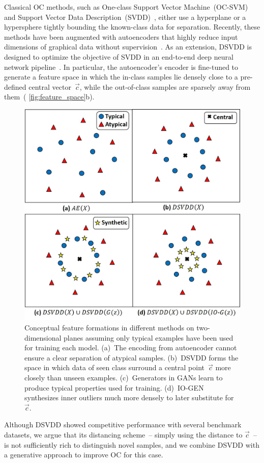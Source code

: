 \documentclass[letterpaper]{article} %
\let\orgautoref\autoref
\renewcommand{\autoref}
{\def\equationautorefname{Equation}%
\def\figureautorefname{Fig.}%
\def\subfigureautorefname{Fig.}%
\def\Itemautorefname{item}%
\def\tableautorefname{Table}%
\def\exerciseautorefname{Exercise}%
\def\starexerciseautorefname{Exercise}%
\def\sectionautorefname{Section}%
\def\subsectionautorefname{Section}%
\def\subsubsectionautorefname{Section}%
\def\chapterautorefname{Section}%
\def\partautorefname{Part}%
\orgautoref}
\begin{document}
Classical OC methods, such as One-class Support Vector
Machine~(OC-SVM)~\citep{SPSSW01} and Support Vector Data
Description~(SVDD)~\citep{TD04}, either use a hyperplane or a
hypersphere tightly bounding the known-class data for separation.
Recently, these methods have been augmented with autoencoders that
highly reduce input dimensions of graphical data without
supervision~\citep{XRYSS15, RGLL20}. As an extension, DSVDD is designed
to optimize the objective of SVDD in an end-to-end deep neural network
pipeline~\citep{RVGDSBMK18}. In particular, the autoencoder's encoder is
fine-tuned to generate a feature space in which the in-class
samples lie densely close to a pre-defined central vector~$\vec{c}$,
while the out-of-class samples are sparsely away from
them~(\autoref{fig:feature_space}b).
\begin{figure}\centering
\includegraphics[width=.7\linewidth]{feature_space}
\caption{
Conceptual feature formations in different methods on
two-dimensional planes assuming only typical examples have been
used for training each model.
(a)~The encoding from autoencoder cannot ensure a clear
separation of atypical samples.
(b)~DSVDD forms the space in which data of seen class surround a
central point~$\vec{c}$ more closely than unseen examples.
(c)~Generators in GANs learn to produce typical properties used
for training.
(d)~\mbox{IO-GEN} synthesizes inner outliers much more densely to later
substitute for~$\vec{c}$.
}
\label{fig:feature_space}
\end{figure}
Although DSVDD showed competitive performance with several benchmark
datasets, we argue that its distancing scheme~-- simply using the
distance to $\vec{c}$~-- is not sufficiently rich to distinguish novel
samples, and we combine DSVDD with a generative approach to improve OC
for this case.
\end{document}
